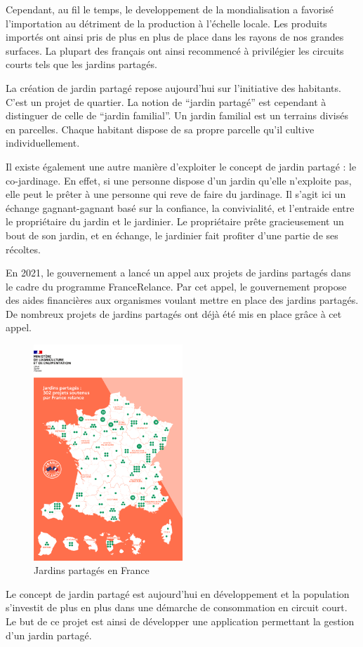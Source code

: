 \documentclass[french,a4paper]{article}
\begin{document}
Cependant, au fil le temps, le developpement de la mondialisation a favorisé l’importation au détriment de la production à l’échelle locale. Les produits importés ont ainsi pris de plus en plus de place dans les rayons de nos grandes surfaces. La plupart des français ont ainsi recommencé à privilégier les circuits courts tels que les jardins partagés.

La création de jardin partagé repose aujourd’hui sur l’initiative des habitants. C’est un projet de quartier. La notion de “jardin partagé” est cependant à distinguer de celle de “jardin familial”.  Un jardin familial est un terrains divisés en parcelles. Chaque habitant dispose de sa propre parcelle qu’il cultive individuellement.

Il existe également une autre manière d’exploiter le concept de jardin partagé : le co-jardinage. En effet, si une personne dispose d’un jardin qu’elle n’exploite pas, elle peut le prêter à une personne qui reve de faire du jardinage. Il s’agit ici un échange gagnant-gagnant basé sur la confiance, la convivialité, et l'entraide entre le propriétaire du jardin et le jardinier. Le propriétaire prête gracieusement un bout de son jardin, et en échange, le jardinier fait profiter d'une partie de ses récoltes.

En 2021, le gouvernement a lancé un appel aux projets de jardins partagés dans le cadre du programme FranceRelance. Par cet appel, le gouvernement propose des aides financières aux organismes voulant mettre en place des jardins partagés. De nombreux projets de jardins partagés ont déjà été mis en place grâce à cet appel.
\begin{figure}[H]
    \centering
    \includegraphics[width=0.5\textwidth]{img/francerelance_carte.png}
    \caption{Jardins partagés en France}
\end{figure}
Le concept de jardin partagé est aujourd’hui en développement et la population s’investit de plus en plus dans une démarche de consommation en circuit court. Le but de ce projet est ainsi de développer une application permettant la gestion d’un jardin partagé.
\end{document}
